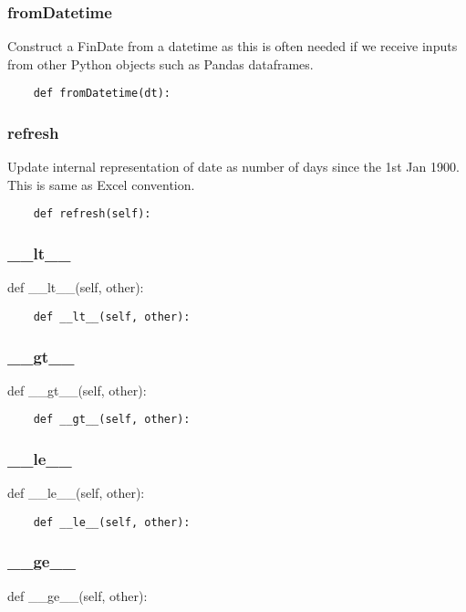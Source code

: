 \documentclass[twoside,11pt]{book}
\begin{document}
\subsubsection*{{\bf fromDatetime}}
Construct a FinDate from a datetime as this is often needed if we receive inputs from other Python objects such as Pandas dataframes.  

\begin{lstlisting}
    def fromDatetime(dt):
\end{lstlisting}

\subsubsection*{{\bf refresh}}
Update internal representation of date as number of days since the 1st Jan 1900. This is same as Excel convention.  

\begin{lstlisting}
    def refresh(self):
\end{lstlisting}

\subsubsection*{{\bf \_\_lt\_\_}}
def \_\_lt\_\_(self, other): 

\begin{lstlisting}
    def __lt__(self, other):
\end{lstlisting}

\subsubsection*{{\bf \_\_gt\_\_}}
def \_\_gt\_\_(self, other): 

\begin{lstlisting}
    def __gt__(self, other):
\end{lstlisting}

\subsubsection*{{\bf \_\_le\_\_}}
def \_\_le\_\_(self, other): 

\begin{lstlisting}
    def __le__(self, other):
\end{lstlisting}

\subsubsection*{{\bf \_\_ge\_\_}}
def \_\_ge\_\_(self, other): 
\end{document}
